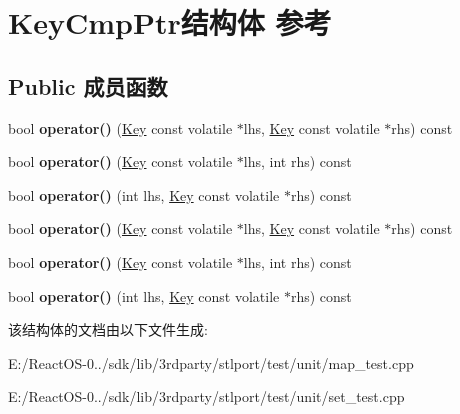 \hypertarget{struct_key_cmp_ptr}{}\section{Key\+Cmp\+Ptr结构体 参考}
\label{struct_key_cmp_ptr}
\subsection*{Public 成员函数}
\begin{DoxyCompactItemize}
\item 
\mbox{\label{struct_key_cmp_ptr_aea3f08c49f05c730b452e56a06e64020}} 
bool {\bfseries operator()} (\hyperlink{struct_key}{Key} const volatile $\ast$lhs, \hyperlink{struct_key}{Key} const volatile $\ast$rhs) const
\item 
\mbox{\label{struct_key_cmp_ptr_ae366c0b31eca18fb695c70541fefa81a}} 
bool {\bfseries operator()} (\hyperlink{struct_key}{Key} const volatile $\ast$lhs, int rhs) const
\item 
\mbox{\label{struct_key_cmp_ptr_a206e003a3aff88750dfe64132543fcb8}} 
bool {\bfseries operator()} (int lhs, \hyperlink{struct_key}{Key} const volatile $\ast$rhs) const
\item 
\mbox{\label{struct_key_cmp_ptr_aea3f08c49f05c730b452e56a06e64020}} 
bool {\bfseries operator()} (\hyperlink{struct_key}{Key} const volatile $\ast$lhs, \hyperlink{struct_key}{Key} const volatile $\ast$rhs) const
\item 
\mbox{\label{struct_key_cmp_ptr_ae366c0b31eca18fb695c70541fefa81a}} 
bool {\bfseries operator()} (\hyperlink{struct_key}{Key} const volatile $\ast$lhs, int rhs) const
\item 
\mbox{\label{struct_key_cmp_ptr_a206e003a3aff88750dfe64132543fcb8}} 
bool {\bfseries operator()} (int lhs, \hyperlink{struct_key}{Key} const volatile $\ast$rhs) const
\end{DoxyCompactItemize}


该结构体的文档由以下文件生成\+:\begin{DoxyCompactItemize}
\item 
E\+:/\+React\+O\+S-\/0../sdk/lib/3rdparty/stlport/test/unit/map\+\_\+test.\+cpp\item 
E\+:/\+React\+O\+S-\/0../sdk/lib/3rdparty/stlport/test/unit/set\+\_\+test.\+cpp\end{DoxyCompactItemize}
